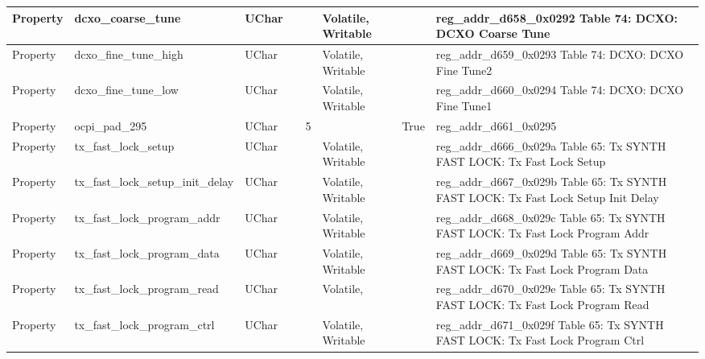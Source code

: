 \documentclass{article}
\begin{document}
\begin{scriptsize}
\begin{longtable}{|p{2cm}|p{5cm}|p{1cm}|p{2cm}|p{2cm}|p{1.75cm}|p{1.5cm}|p{5.1cm}|}
  \hline
  Property & dcxo\_coarse\_tune                                       & UChar &                  &                  & Volatile,  Writable &         & reg\_addr\_d658\_0x0292 Table 74: DCXO: DCXO Coarse Tune \\
  \hline
  Property & dcxo\_fine\_tune\_high                                   & UChar &                  &                  & Volatile,  Writable &         & reg\_addr\_d659\_0x0293 Table 74: DCXO: DCXO Fine Tune2 \\
  \hline
  Property & dcxo\_fine\_tune\_low                                    & UChar &                  &                  & Volatile,  Writable &         & reg\_addr\_d660\_0x0294 Table 74: DCXO: DCXO Fine Tune1 \\
  \hline
  Property & ocpi\_pad\_295                                           & UChar &                  & 5                &                     & True    & reg\_addr\_d661\_0x0295 \\
  \hline
  Property & tx\_fast\_lock\_setup                                    & UChar &                  &                  & Volatile,  Writable &         & reg\_addr\_d666\_0x029a Table 65: Tx SYNTH FAST LOCK: Tx Fast Lock Setup \\
  \hline
  Property & tx\_fast\_lock\_setup\_init\_delay                       & UChar &                  &                  & Volatile,  Writable &         & reg\_addr\_d667\_0x029b Table 65: Tx SYNTH FAST LOCK: Tx Fast Lock Setup Init Delay \\
  \hline
  Property & tx\_fast\_lock\_program\_addr                            & UChar &                  &                  & Volatile,  Writable &         & reg\_addr\_d668\_0x029c Table 65: Tx SYNTH FAST LOCK: Tx Fast Lock Program Addr \\
  \hline
  Property & tx\_fast\_lock\_program\_data                            & UChar &                  &                  & Volatile,  Writable &         & reg\_addr\_d669\_0x029d Table 65: Tx SYNTH FAST LOCK: Tx Fast Lock Program Data \\
  \hline
  Property & tx\_fast\_lock\_program\_read                            & UChar &                  &                  & Volatile,           &         & reg\_addr\_d670\_0x029e Table 65: Tx SYNTH FAST LOCK: Tx Fast Lock Program Read \\
  \hline
  Property & tx\_fast\_lock\_program\_ctrl                            & UChar &                  &                  & Volatile,  Writable &         & reg\_addr\_d671\_0x029f Table 65: Tx SYNTH FAST LOCK: Tx Fast Lock Program Ctrl \\

\end{longtable}
\end{scriptsize}
\end{document}
